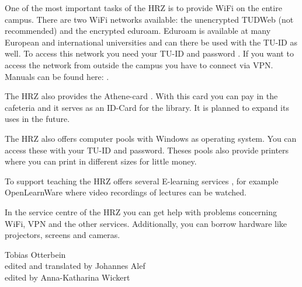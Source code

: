 {One of the most important tasks of the HRZ is to provide WiFi on the entire campus. There are two WiFi networks available: the unencrypted TUDWeb (not recommended) and the encrypted eduroam. Eduroam is available at many European and international universities and can there be used with the TU-ID as well. To access this network you need your TU-ID and password \footnotemark[12]. If you want to access the network from outside the campus you have to connect via VPN. Manuals can be found here: \footnotemark[12].

The HRZ also provides the Athene-card \footnotemark[13]. With this card you can pay in the cafeteria and it serves as an ID-Card for the library. It is planned to expand its uses in the future.

The HRZ also offers computer pools with Windows as operating system. You can access these with your TU-ID and password. Theses pools also provide printers where you can print in different sizes for little money.

To support teaching the HRZ offers several E-learning services \footnotemark[14], for example OpenLearnWare where video recordings of lectures can be watched.

In the service centre of the HRZ \footnotemark[15] you can get help with problems concerning WiFi, VPN and the other services. Additionally, you can borrow hardware like projectors, screens and cameras.
}
{Tobias Otterbein\\edited and translated by Johannes Alef\\edited by Anna-Katharina Wickert}




\newpage
